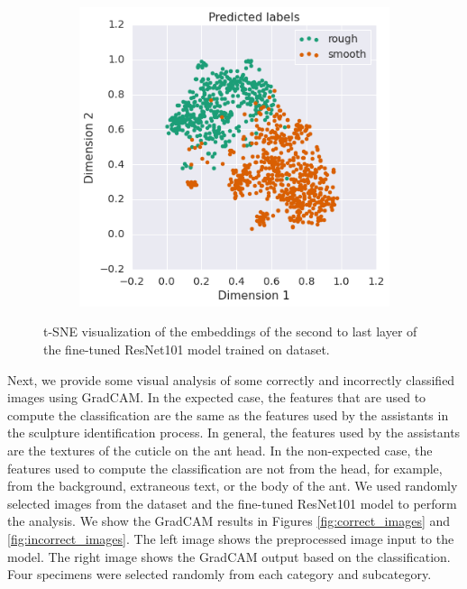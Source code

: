 \documentclass{aci}
\numberwithin{equation}{section}
\begin{document}
\begin{figure}[h!]
\begin{subfigure}{.45\textwidth}
        \includegraphics[width=1\linewidth]{thesis_assets/plots/fresnet101_pred_tsne.png}
    \end{subfigure}
    \caption{t-SNE visualization of the embeddings of the second to last layer
        of the fine-tuned ResNet101 model trained on dataset.}
    \label{fig:fresnet101_tsne}
\end{figure}



Next, we provide some visual analysis of some correctly and incorrectly
classified images using GradCAM. In the expected case, the features that are
used to compute the classification are the same as the features used by the
assistants in the sculpture identification process. In general, the features
used by the assistants are the textures of the cuticle on the ant head. In the
non-expected case, the features used to compute the classification are not from
the head, for example, from the background, extraneous text, or the body of the
ant. We used randomly selected images from the dataset and the fine-tuned
ResNet101 model to perform the analysis. We show the GradCAM results in Figures
\ref{fig:correct_images} and \ref{fig:incorrect_images}. The left image shows
the preprocessed image input to the model. The right image shows the GradCAM
output based on the classification. Four specimens were selected randomly from
each category and subcategory.
\end{document}
